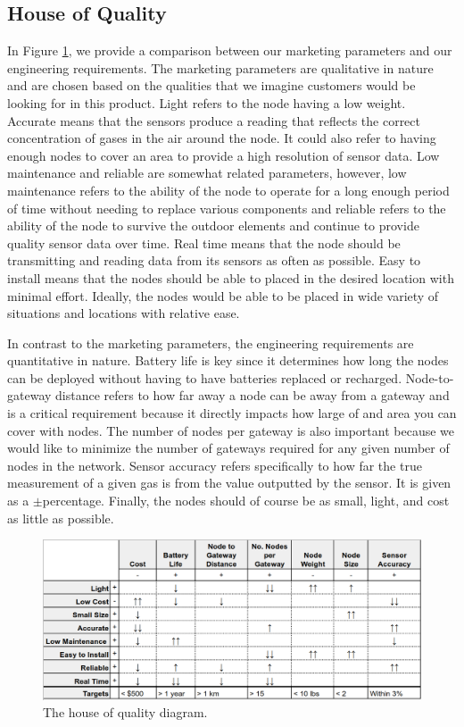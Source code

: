 \subsection{House of Quality}
In Figure \ref{fig:hoq}, we provide a comparison between our marketing parameters and our engineering requirements. The marketing parameters are qualitative in nature and are chosen based on the qualities that we imagine customers would be looking for in this product. Light refers to the node having a low weight. Accurate means that the sensors produce a reading that reflects the correct concentration of gases in the air around the node. It could also refer to having enough nodes to cover an area to provide a high resolution of sensor data. Low maintenance and reliable are somewhat related parameters, however, low maintenance refers to the ability of the node to operate for a long enough period of time without needing to replace various components and reliable refers to the ability of the node to survive the outdoor elements and continue to provide quality sensor data over time. Real time means that the node should be transmitting and reading data from its sensors as often as possible. Easy to install means that the nodes should be able to placed in the desired location with minimal effort. Ideally, the nodes would be able to be placed in wide variety of situations and locations with relative ease.

In contrast to the marketing parameters, the engineering requirements are quantitative in nature. Battery life is key since it determines how long the nodes can be deployed without having to have batteries replaced or recharged. Node-to-gateway distance refers to how far away a node can be away from a gateway and is a critical requirement because it directly impacts how large of and area you can cover with nodes. The number of nodes per gateway is also important because we would like to minimize the number of gateways required for any given number of nodes in the network. Sensor accuracy refers specifically to how far the true measurement of a given gas is from the value outputted by the sensor. It is given as a $\pm$percentage. Finally, the nodes should of course be as small, light, and cost as little as possible.
\begin{figure}[tbh]
    \centering
    \includegraphics[width=6.25in]{./figures/hoq.png} 
    \caption{The house of quality diagram.}
    \label{fig:hoq}
\end{figure}


